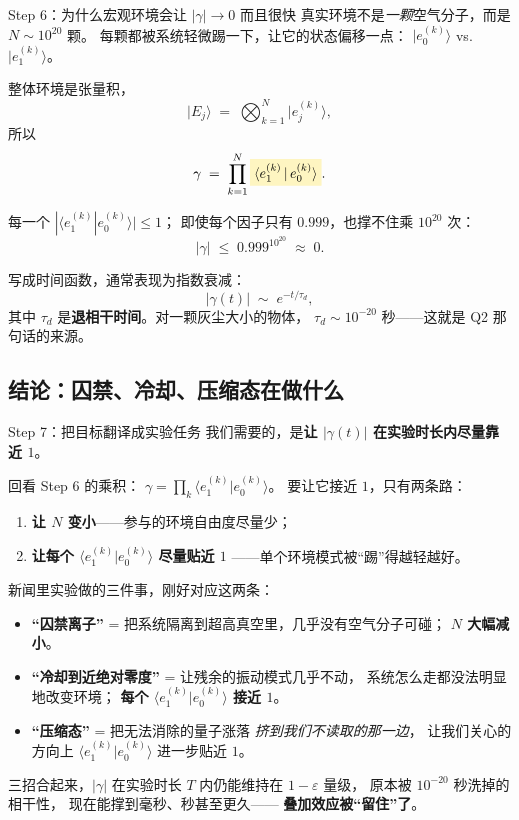 \documentclass[11pt,a4paper]{ctexart}
\newcommand{\hl}[1]{\colorbox{Goldenrod!28}{$\displaystyle #1$}}
\begin{document}
\begin{stepblock}{Step 6：为什么宏观环境会让 $|\gamma|\to 0$ 而且很快}
真实环境不是\emph{一颗}空气分子，而是 $N\sim 10^{20}$ 颗。
每颗都被系统轻微踢一下，让它的状态偏移一点：
$\lvert e^{(k)}_0\rangle$ vs.\ $\lvert e^{(k)}_1\rangle$。

整体环境是张量积，
\[
  \lvert E_j\rangle \;=\; \bigotimes_{k=1}^{N} \lvert e^{(k)}_j\rangle,
\]
所以
\[
  \gamma \;=\; \prod_{k=1}^{N} \hl{\langle e^{(k)}_1\,|\,e^{(k)}_0\rangle}.
\]

每一个 $|\langle e^{(k)}_1|e^{(k)}_0\rangle| \le 1$；
即使每个因子只有 $0.999$，也撑不住乘 $10^{20}$ 次：
\[
  |\gamma| \;\le\; 0.999^{10^{20}} \;\approx\; 0.
\]

写成时间函数，通常表现为指数衰减：
\[
  |\gamma(t)| \;\sim\; e^{-t/\tau_d},
\]
其中 $\tau_d$ 是\textbf{退相干时间}。对一颗灰尘大小的物体，
$\tau_d \sim 10^{-20}$ 秒——这就是 Q2 那句话的来源。
\end{stepblock}

\subsection{结论：囚禁、冷却、压缩态在做什么}

\begin{stepblock}{Step 7：把目标翻译成实验任务}
我们需要的，是\textbf{让 $|\gamma(t)|$ 在实验时长内尽量靠近 $1$}。
\smallskip

回看 Step 6 的乘积：
$\gamma = \prod_k \langle e^{(k)}_1|e^{(k)}_0\rangle$。
要让它接近 $1$，只有两条路：
\begin{enumerate}
  \item \textbf{让 $N$ 变小}——参与的环境自由度尽量少；
  \item \textbf{让每个 $\langle e^{(k)}_1|e^{(k)}_0\rangle$ 尽量贴近 $1$}
        ——单个环境模式被``踢''得越轻越好。
\end{enumerate}

新闻里实验做的三件事，刚好对应这两条：

\begin{itemize}
  \item \textbf{``囚禁离子''} = 把系统隔离到超高真空里，几乎没有空气分子可碰；
        \textbf{$N$ 大幅减小}。
  \item \textbf{``冷却到近绝对零度''} = 让残余的振动模式几乎不动，
        系统怎么走都没法明显地改变环境；
        \textbf{每个 $\langle e^{(k)}_1|e^{(k)}_0\rangle$ 接近 $1$}。
  \item \textbf{``压缩态''} = 把无法消除的量子涨落
        \emph{挤到我们不读取的那一边}，
        让我们关心的方向上 $\langle e^{(k)}_1|e^{(k)}_0\rangle$ 进一步贴近 $1$。
\end{itemize}

三招合起来，$|\gamma|$ 在实验时长 $T$ 内仍能维持在 $1-\varepsilon$ 量级，
原本被 $10^{-20}$ 秒洗掉的相干性，
现在能撑到毫秒、秒甚至更久——
\textbf{叠加效应被``留住''了}。
\end{stepblock}
\end{document}
